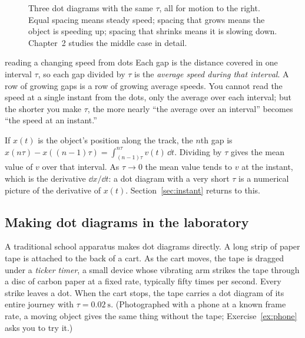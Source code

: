 \begin{figure}[htb]
\centering
{}
\caption{Three dot diagrams with the same $\tau$, all for motion to the right. Equal spacing means steady speed; spacing that grows means the object is speeding up; spacing that shrinks means it is slowing down. Chapter~2 studies the middle case in detail.}
\label{fig:changing}
\end{figure}

\begin{twoviews}{reading a changing speed from dots}
\elem Each gap is the distance covered in one interval $\tau$, so each gap divided by $\tau$ is the \emph{average speed during that interval}. A row of growing gaps is a row of growing average speeds. You cannot read the speed at a single instant from the dots, only the average over each interval; but the shorter you make $\tau$, the more nearly ``the average over an interval'' becomes ``the speed at an instant.''

\calc If $x(t)$ is the object's position along the track, the $n$th gap is $x(n\tau) - x((n-1)\tau) = \int_{(n-1)\tau}^{n\tau} v(t)\,\dd t$. Dividing by $\tau$ gives the mean value of $v$ over that interval. As $\tau \to 0$ the mean value tends to $v$ at the instant, which is the derivative $\dd x/\dd t$: a dot diagram with a very short $\tau$ is a numerical picture of the derivative of $x(t)$. Section~\ref{sec:instant} returns to this.
\end{twoviews}

\subsection{Making dot diagrams in the laboratory}

A traditional school apparatus makes dot diagrams directly. A long strip of paper tape is attached to the back of a cart. As the cart moves, the tape is dragged under a \emph{ticker timer}, a small device whose vibrating arm strikes the tape through a disc of carbon paper at a fixed rate, typically fifty times per second. Every strike leaves a dot. When the cart stops, the tape carries a dot diagram of its entire journey with $\tau = \SI{0.02}{\second}$. (Photographed with a phone at a known frame rate, a moving object gives the same thing without the tape; Exercise~\ref{ex:phone} asks you to try it.)

